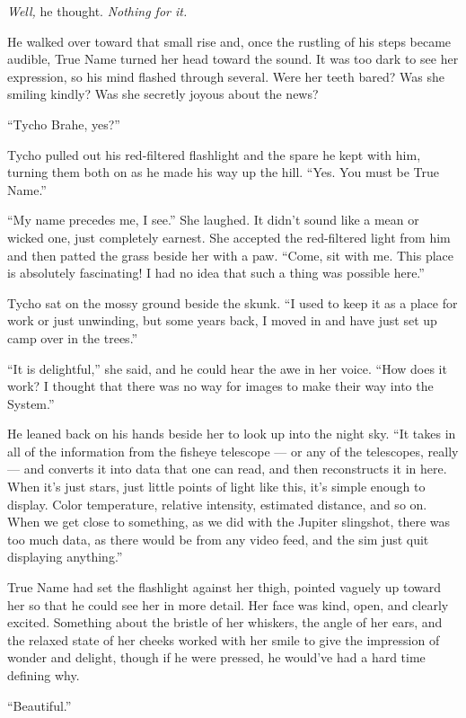 \emph{Well,} he thought. \emph{Nothing for it.}

He walked over toward that small rise and, once the rustling of his steps became audible, True Name turned her head toward the sound. It was too dark to see her expression, so his mind flashed through several. Were her teeth bared? Was she smiling kindly? Was she secretly joyous about the news?

``Tycho Brahe, yes?''

Tycho pulled out his red-filtered flashlight and the spare he kept with him, turning them both on as he made his way up the hill. ``Yes. You must be True Name.''

``My name precedes me, I see.'' She laughed. It didn't sound like a mean or wicked one, just completely earnest. She accepted the red-filtered light from him and then patted the grass beside her with a paw. ``Come, sit with me. This place is absolutely fascinating! I had no idea that such a thing was possible here.''

Tycho sat on the mossy ground beside the skunk. ``I used to keep it as a place for work or just unwinding, but some years back, I moved in and have just set up camp over in the trees.''

``It is delightful,'' she said, and he could hear the awe in her voice. ``How does it work? I thought that there was no way for images to make their way into the System.''

He leaned back on his hands beside her to look up into the night sky. ``It takes in all of the information from the fisheye telescope — or any of the telescopes, really — and converts it into data that one can read, and then reconstructs it in here. When it's just stars, just little points of light like this, it's simple enough to display. Color temperature, relative intensity, estimated distance, and so on. When we get close to something, as we did with the Jupiter slingshot, there was too much data, as there would be from any video feed, and the sim just quit displaying anything.''

True Name had set the flashlight against her thigh, pointed vaguely up toward her so that he could see her in more detail. Her face was kind, open, and clearly excited. Something about the bristle of her whiskers, the angle of her ears, and the relaxed state of her cheeks worked with her smile to give the impression of wonder and delight, though if he were pressed, he would've had a hard time defining why.

``Beautiful.''


